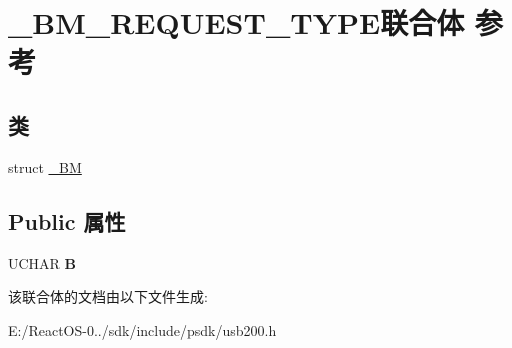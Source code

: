 \hypertarget{union___b_m___r_e_q_u_e_s_t___t_y_p_e}{}\section{\+\_\+\+B\+M\+\_\+\+R\+E\+Q\+U\+E\+S\+T\+\_\+\+T\+Y\+P\+E联合体 参考}
\label{union___b_m___r_e_q_u_e_s_t___t_y_p_e}
\subsection*{类}
\begin{DoxyCompactItemize}
\item 
struct \hyperlink{struct___b_m___r_e_q_u_e_s_t___t_y_p_e_1_1___b_m}{\+\_\+\+BM}
\end{DoxyCompactItemize}
\subsection*{Public 属性}
\begin{DoxyCompactItemize}
\item 
\mbox{\label{union___b_m___r_e_q_u_e_s_t___t_y_p_e_aa6804cdd2b69963f504c8ad71ab4cf1a}} 
U\+C\+H\+AR {\bfseries B}
\end{DoxyCompactItemize}


该联合体的文档由以下文件生成\+:\begin{DoxyCompactItemize}
\item 
E\+:/\+React\+O\+S-\/0../sdk/include/psdk/usb200.\+h\end{DoxyCompactItemize}
